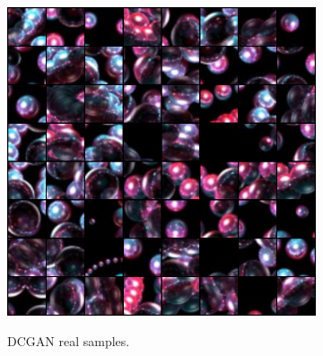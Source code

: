\documentclass[letterpaper]{article} %
\begin{document}
\begin{figure}[h!]
\centering
\begin{subfigure}{0.45\textwidth}
\begin{center}
\begin{minipage}[t]{0.95\linewidth}
\begin{centering}
{\includegraphics[width=\linewidth]{dcgan_real.png}}
\caption{DCGAN real samples.}
\label{fig:srgan_training_outputs}
\end{centering}
\end{minipage}
\end{center}
\end{subfigure}
\begin{subfigure}{0.45\textwidth}
\begin{center}
\begin{minipage}[t]{0.95\linewidth}
\begin{centering}

\end{centering}
\end{minipage}
\end{center}
\end{subfigure}
\end{figure}
\end{document}
